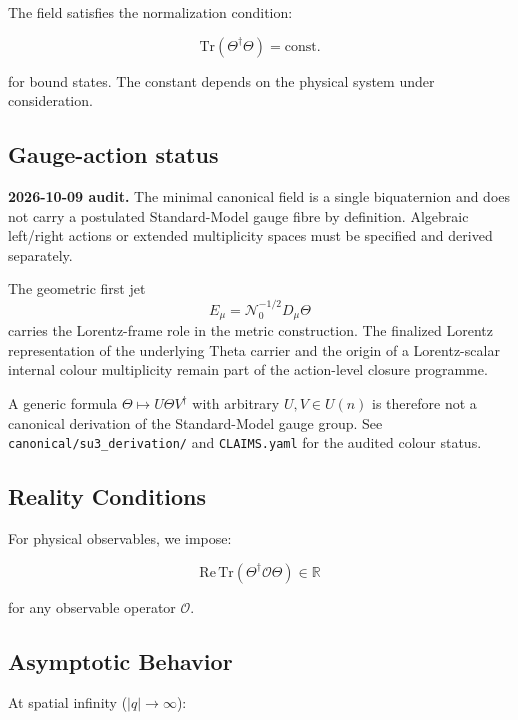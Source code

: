 The field satisfies the normalization condition:

\begin{equation}
\label{eq:canonical:theta_normalization}
\text{Tr}(\Theta^\dagger \Theta) = \text{const.}
\end{equation}

for bound states. The constant depends on the physical system under consideration.

\subsection{Gauge-action status}

\textbf{2026-10-09 audit.} The minimal canonical field is a single
biquaternion and does not carry a postulated Standard-Model gauge fibre by
definition. Algebraic left/right actions or extended multiplicity spaces must
be specified and derived separately.

The geometric first jet
\[
E_\mu=\mathcal N_0^{-1/2}D_\mu\Theta
\]
carries the Lorentz-frame role in the metric construction. The finalized
Lorentz representation of the underlying Theta carrier and the origin of a
Lorentz-scalar internal colour multiplicity remain part of the action-level
closure programme.

A generic formula $\Theta\mapsto U\Theta V^\dagger$ with arbitrary
$U,V\in U(n)$ is therefore not a canonical derivation of the Standard-Model
gauge group. See \texttt{canonical/su3\_derivation/} and
\texttt{CLAIMS.yaml} for the audited colour status.

\subsection{Reality Conditions}

For physical observables, we impose:

\begin{equation}
\label{eq:canonical:theta_reality}
\text{Re}\,\text{Tr}(\Theta^\dagger \mathcal{O} \Theta) \in \mathbb{R}
\end{equation}

for any observable operator $\mathcal{O}$.

\subsection{Asymptotic Behavior}

At spatial infinity ($|q| \to \infty$):

